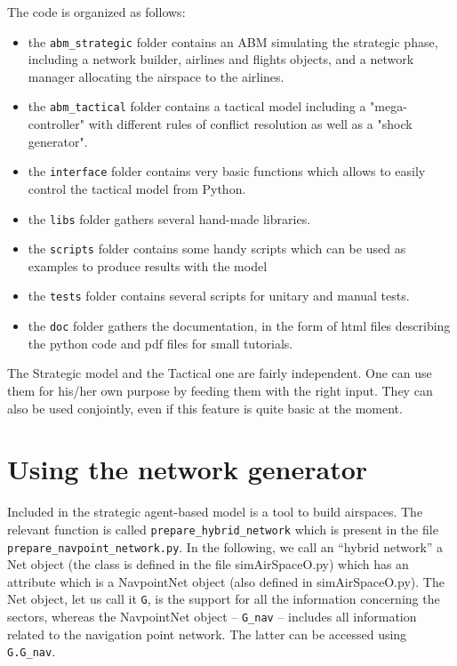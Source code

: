 \documentclass[12pt]{article}
\begin{document}
The code is organized as follows:
\begin{itemize}
\item the \verb|abm_strategic| folder contains an ABM simulating the strategic phase, including a network builder, airlines and flights objects, and a network manager allocating the airspace to the airlines. 
\item the \verb|abm_tactical| folder contains a tactical model including a "mega-controller" with different rules of conflict resolution as well as a "shock generator".
\item the \verb|interface| folder contains very basic functions which allows to easily control the tactical model from Python.
\item the \verb|libs| folder gathers several hand-made libraries.
\item the \verb|scripts| folder contains some handy scripts which can be used as examples to produce results with the model
\item the \verb|tests| folder contains several scripts for unitary and manual tests. 
\item the \verb|doc| folder gathers the documentation, in the form of html files describing the python code and pdf files for small tutorials.
\end{itemize}          

The Strategic model and the Tactical one are fairly independent. One can use them for his/her own purpose by feeding them with the right input. They can also be used conjointly, even if this feature is quite basic at the moment. 

\section{Using the network generator}
\label{sec:network}

Included in the strategic agent-based model is a tool to build airspaces. The relevant function is called \verb|prepare_hybrid_network| which is present in the file \verb|prepare_navpoint_network.py|. In the following, we call an ``hybrid network'' a Net object (the class is defined in the file simAirSpaceO.py) which has an attribute which is a NavpointNet object (also defined in simAirSpaceO.py). The Net object, let us call it \verb|G|, is the support for all the information concerning the sectors, whereas the NavpointNet object -- \verb|G_nav| -- includes all information related to the navigation point network. The latter can be accessed using \verb|G.G_nav|.
\end{document}

